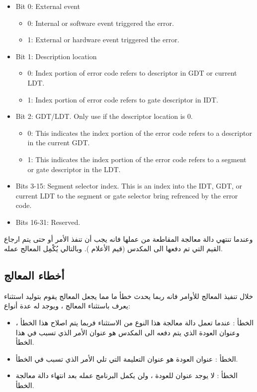 \documentclass[document.tex]{subfiles}
\begin{document}
\begin{english}

\begin{itemize}
\item Bit 0: External event
\begin{itemize}
\item 0: Internal or software event triggered the error.
\item 1: External or hardware event triggered the error.
\end{itemize}
\item Bit 1: Description location
\begin{itemize}
\item 0: Index portion of error code refers to descriptor in GDT or current LDT.
\item 1: Index portion of error code refers to gate descriptor in IDT.
\end{itemize}
\item Bit 2: GDT/LDT. Only use if the descriptor location is 0.
\begin{itemize}
\item 0: This indicates the index portion of the error code refers to a descriptor in the current GDT.
\item 1: This indicates the index portion of the error code refers to a segment or gate descriptor in the LDT.
\end{itemize}
\item Bits 3-15: Segment selector index. This is an index into the IDT, GDT, or current LDT to the segment or gate selector bring refrenced by the error code.
\item  Bits 16-31: Reserved.

\end{itemize}
\end{english}

وعندما تنتهي دالة معالجة المقاطعة من عملها فانه يجب أن تنفذ الأمر  أو  حتى يتم ارجاع القيم التي تم دفعها الى المكدس (قيم الأعلام ). وبالتالي يُكْمِل المعالج عمله.

 

\subsection{أخطاء المعالج}
خلال تنفيذ المعالج للأوامر فانه ربما يحدث خطأ ما مما يجعل المعالج يقوم بتوليد استثناء يعرف باستثناء المعالج ، ويوجد له عدة أنواع:

\begin{itemize}
\item الخطأ : عندما تعمل دالة معالجة هذا النوع من الاستثناء فربما يتم اصلاح هذا الخطأ ، وعنوان العودة الذي يتم دفعه الى المكدس هو عنوان الأمر الذي تسبب في هذا الخطأ.
\item الخطأ : عنوان العودة هو عنوان التعليمة التي تلي الأمر الذي تسبب في الخطأ.
\item الخطأ : لا يوجد عنوان للعودة ، ولن يكمل البرنامج عمله بعد انتهاء دالة معالجة الخطأ. 
\end{itemize}
\end{document}
